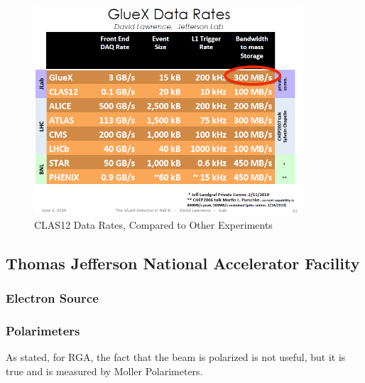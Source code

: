     \begin{figure}[H]
        \centering
        \includegraphics[width=10cm]{Chapters/Ch2-Experiment/clas-12-exp/clas-detectors/other/pics/good_data_rates_slide.png}
        \caption{CLAS12 Data Rates, Compared to Other Experiments }
    \end{figure}

    
        \subsection{Thomas Jefferson National Accelerator Facility}
            \subsubsection{Electron Source}    
            \subsubsection{Polarimeters}
                    As stated, for RGA, the fact that the beam is polarized is not useful, but it is true and is measured by Moller Polarimeters. 
    
           
    
